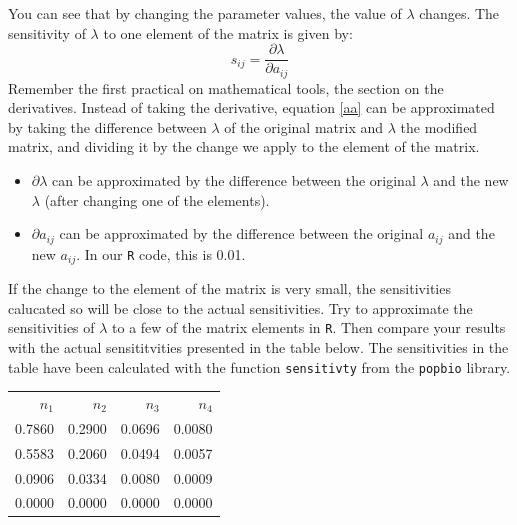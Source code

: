 \documentclass{article}\usepackage[]{graphicx}\usepackage[]{color}
\begin{document}
You can see that by changing the parameter values, the value of $\lambda$ changes. The sensitivity of $\lambda$ to one element of the matrix is given by:
\begin{equation}\label{aa}
s_{ij}=\frac{\partial \lambda} {\partial a_{ij}}
\end{equation}
Remember the first practical on mathematical tools, the section on the derivatives. Instead of taking the derivative, equation \ref{aa} can be approximated by taking the difference between $\lambda$ of the original matrix and $\lambda$ the modified matrix, and dividing it by the change we apply to the element of the matrix. 
\begin{itemize}
\item $\partial \lambda$ \; can be approximated by the difference between the original $\lambda$ \; and the new $\lambda$ (after changing one of the elements).
\item $\partial a_{ij}$ can be approximated by the difference between the original $a_{ij}$ and the new $a_{ij}$. In our \texttt{R} code, this is 0.01.  
\end{itemize}
If the change to the element of the matrix is very small, the sensitivities calucated so will be close to the actual sensitivities. Try to approximate the sensitivities of $\lambda$ to a few of the matrix elements in \texttt{R}. Then compare your results with the actual sensititvities presented in the table below. The sensitivities in the table have been calculated with the function \texttt{sensitivty} from the \texttt{popbio} library. 



{\footnotesize
\begin{tabular}{rrrr}
  
 $n_1$ & $n_2$ & $n_3$ & $n_4$ \\
 
 0.7860 & 0.2900 & 0.0696 & 0.0080 \\ 
  0.5583 & 0.2060 & 0.0494 & 0.0057 \\ 
  0.0906 & 0.0334 & 0.0080 & 0.0009 \\ 
  0.0000 & 0.0000 & 0.0000 & 0.0000 \\ 
   
\end{tabular}
}
\end{document}
